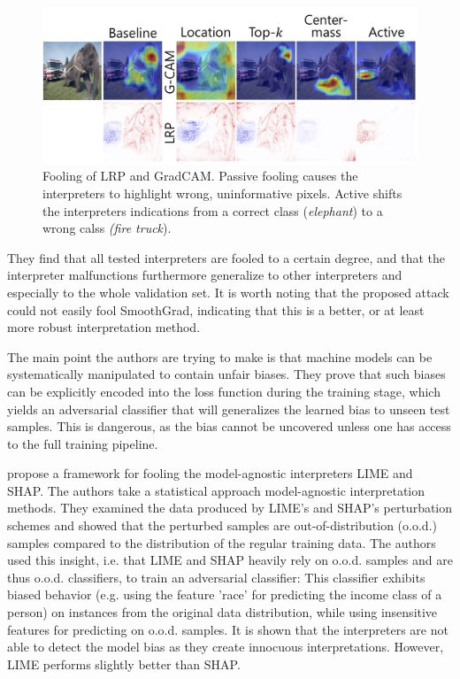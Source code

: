 \begin{figure}[ht]
    \centering
    \includegraphics[width=\linewidth]{figures/heo_intro.jpg}
    \caption{Fooling of LRP and GradCAM. Passive fooling causes the interpreters to highlight wrong, uninformative pixels. Active shifts the interpreters indications from a correct class (\textit{elephant}) to a wrong calss \textit{(fire truck}).}
    \label{fig:heo_intro}
    \vspace{-0.3cm}
\end{figure}

 They find that all tested interpreters are fooled to a certain degree, and that the interpreter malfunctions furthermore generalize to other interpreters and especially to the whole validation set. It is worth noting that the proposed attack could not easily fool SmoothGrad, indicating that this is a better, or at least more robust interpretation method. 

The main point the authors are trying to make is that machine models can be systematically manipulated to contain unfair biases. They prove that such biases can be explicitly encoded into the loss function during the training stage, which yields an adversarial classifier that will generalizes the learned bias to unseen test samples. This is dangerous, as the bias cannot be uncovered unless one has access to the full training pipeline. 

\cite{advlime_aies20} propose a framework for fooling the model-agnostic interpreters LIME and SHAP. 
The authors take a statistical approach model-agnostic interpretation methods. They examined the data produced by LIME's and SHAP's perturbation schemes and showed that the perturbed samples are out-of-distribution (o.o.d.) samples compared to the distribution of the regular training data. The authors used this insight, i.e. that LIME and SHAP heavily rely on o.o.d. samples and are thus o.o.d. classifiers, to train an adversarial classifier: This classifier exhibits biased behavior (e.g. using the feature 'race' for predicting the income class of a person) on instances from the original data distribution, while using insensitive features for predicting on o.o.d. samples. It is shown that the interpreters are not able to detect the model bias as they create innocuous interpretations. However, LIME performs slightly better than SHAP. 

